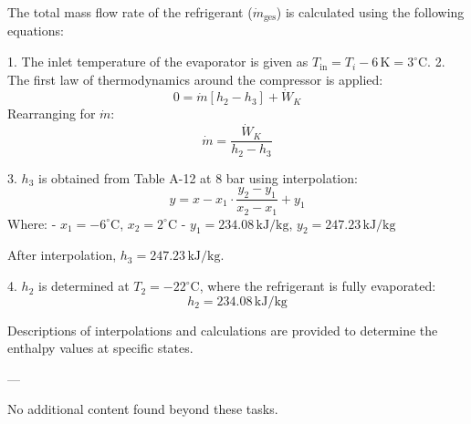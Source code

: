 The total mass flow rate of the refrigerant (\( \dot{m}_{\text{ges}} \)) is calculated using the following equations:  

1. The inlet temperature of the evaporator is given as \( T_{\text{in}} = T_i - 6 \, \text{K} = 3^\circ \text{C} \).  
2. The first law of thermodynamics around the compressor is applied:  
   \[
   0 = \dot{m} \left[ h_2 - h_3 \right] + \dot{W}_K
   \]  
   Rearranging for \( \dot{m} \):  
   \[
   \dot{m} = \frac{\dot{W}_K}{h_2 - h_3}
   \]  

3. \( h_3 \) is obtained from Table A-12 at 8 bar using interpolation:  
   \[
   y = x - x_1 \cdot \frac{y_2 - y_1}{x_2 - x_1} + y_1
   \]  
   Where:  
   - \( x_1 = -6^\circ \text{C} \), \( x_2 = 2^\circ \text{C} \)  
   - \( y_1 = 234.08 \, \text{kJ/kg} \), \( y_2 = 247.23 \, \text{kJ/kg} \)  

   After interpolation, \( h_3 = 247.23 \, \text{kJ/kg} \).  

4. \( h_2 \) is determined at \( T_2 = -22^\circ \text{C} \), where the refrigerant is fully evaporated:  
   \[
   h_2 = 234.08 \, \text{kJ/kg}
   \]  

Descriptions of interpolations and calculations are provided to determine the enthalpy values at specific states.  

---

No additional content found beyond these tasks.